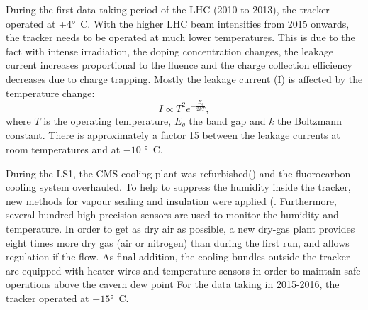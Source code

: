   
  
  
   During the first data taking period of the LHC (2010 to 2013), the tracker operated at +4\si{ \degree C}. With the higher LHC beam intensities from 2015 onwards, the tracker needs to be operated at much lower temperatures. This is due to the fact with intense irradiation, the doping concentration changes, the leakage current increases proportional to the fluence and the charge collection efficiency decreases due to charge trapping. Mostly the leakage current (I) is affected by the temperature change: 
   \begin{equation}
   I \propto T^2 e^{-\frac{E_g}{2kT}}, 
   \end{equation}
    where $T$ is the operating temperature, $E_g$ the band gap and $k$ the Boltzmann constant. There is approximately a factor 15 between the leakage currents at room temperatures and at $-10$ \si{ \degree C}. 
    
    During the LS1, the CMS cooling plant was refurbished\cite{running:1998606}() and the fluorocarbon cooling system overhauled. To help to suppress the humidity inside the tracker, new methods for vapour sealing and insulation were applied (. Furthermore, several hundred high-precision sensors are used to monitor the humidity and temperature. In order to get as dry air as possible, a new dry-gas plant provides eight times more dry gas (air or nitrogen) than during the first run, and allows regulation if the flow. As final addition, the cooling bundles outside the tracker are equipped with heater wires and temperature sensors in order to maintain safe operations above the cavern dew point For the data taking in 2015-2016, the tracker operated at $-15$\si{ \degree C}.
    
